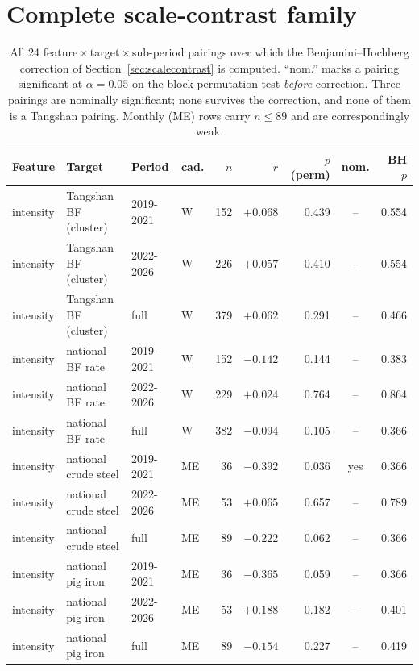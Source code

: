 \documentclass[11pt,a4paper]{article}
\begin{document}
\appendix

\section{Complete scale-contrast family}
\label{app:scalecontrast}

\begin{table}[h]
\centering
\caption{All 24 feature\,$\times$\,target\,$\times$\,sub-period pairings over which the
Benjamini--Hochberg correction of Section~\ref{sec:scalecontrast} is computed. ``nom.'' marks a
pairing significant at $\alpha=0.05$ on the block-permutation test \emph{before} correction.
Three pairings are nominally significant; none survives the correction, and none of them is a
Tangshan pairing. Monthly (ME) rows carry $n\le89$ and are correspondingly weak.}
\label{tab:scalecontrast-full}
\footnotesize
\begin{tabular}{@{}llllrrrcr@{}}
\toprule
Feature & Target & Period & cad. & $n$ & $r$ & $p$ (perm) & nom. & BH $p$ \\
\midrule
intensity & Tangshan BF (cluster) & 2019-2021 & W & 152 & $+0.068$ & 0.439 & -- & 0.554 \\
intensity & Tangshan BF (cluster) & 2022-2026 & W & 226 & $+0.057$ & 0.410 & -- & 0.554 \\
intensity & Tangshan BF (cluster) & full & W & 379 & $+0.062$ & 0.291 & -- & 0.466 \\
\addlinespace
intensity & national BF rate & 2019-2021 & W & 152 & $-0.142$ & 0.144 & -- & 0.383 \\
intensity & national BF rate & 2022-2026 & W & 229 & $+0.024$ & 0.764 & -- & 0.864 \\
intensity & national BF rate & full & W & 382 & $-0.094$ & 0.105 & -- & 0.366 \\
\addlinespace
intensity & national crude steel & 2019-2021 & ME & 36 & $-0.392$ & 0.036 & yes & 0.366 \\
intensity & national crude steel & 2022-2026 & ME & 53 & $+0.065$ & 0.657 & -- & 0.789 \\
intensity & national crude steel & full & ME & 89 & $-0.222$ & 0.062 & -- & 0.366 \\
\addlinespace
intensity & national pig iron & 2019-2021 & ME & 36 & $-0.365$ & 0.059 & -- & 0.366 \\
intensity & national pig iron & 2022-2026 & ME & 53 & $+0.188$ & 0.182 & -- & 0.401 \\
intensity & national pig iron & full & ME & 89 & $-0.154$ & 0.227 & -- & 0.419 \\

\end{tabular}
\end{table}
\end{document}
